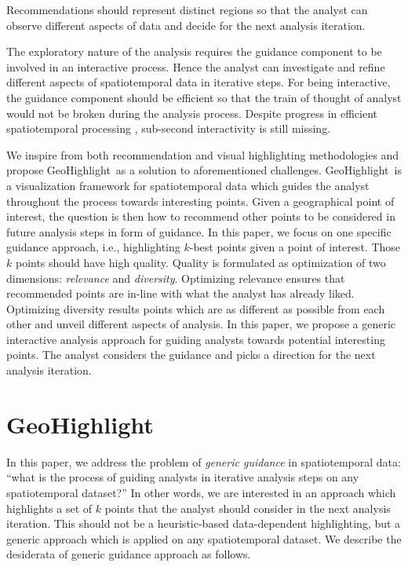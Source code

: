\documentclass[conference]{IEEEtran}
\newcommand{\sys}{{\sc GeoHighlight}}
\begin{document}
 Recommendations should represent distinct regions so that the analyst can observe different aspects of data and decide for the next analysis iteration.

 The exploratory nature of the analysis requires the guidance component to be involved in an interactive process. Hence the analyst can investigate and refine different aspects of spatiotemporal data in iterative steps. For being interactive, the guidance component should be efficient so that the train of thought of analyst would not be broken during the analysis process. Despite progress in efficient spatiotemporal processing \cite{yu2015geospark}, sub-second interactivity is still missing.

We inspire from both recommendation \cite{Omidvar-Tehrani:2015} and visual highlighting \cite{Liang2010,Robinson2011} methodologies and propose \sys\ as a solution to aforementioned challenges. \sys\ is a visualization framework for spatiotemporal data which guides the analyst throughout the process towards interesting points. Given a geographical point of interest, the question is then how to recommend other points to be considered in future analysis steps in form of guidance. In this paper, we focus on one specific guidance approach, i.e., highlighting $k$-best points given a point of interest. Those $k$ points should have high quality. Quality is formulated as optimization of two dimensions: {\em relevance} and {\em diversity}. Optimizing relevance ensures that recommended points are in-line with what the analyst has already liked. Optimizing diversity results points which are as different as possible from each other and unveil different aspects of analysis. In this paper, we propose a generic interactive analysis approach for guiding analysts towards potential interesting points. The analyst considers the guidance and picks a direction for the next analysis iteration.

\vspace{-5pt}

\section{\sys}
In this paper, we address the problem of {\em generic guidance} in spatiotemporal data: ``what is the process of guiding analysts in iterative analysis steps on any spatiotemporal dataset?'' In other words, we are interested in an approach which highlights a set of $k$ points that the analyst should consider in the next analysis iteration. This should not be a heuristic-based data-dependent highlighting, but a generic approach which is applied on any spatiotemporal dataset. We describe the desiderata of generic guidance approach as follows.
\end{document}
